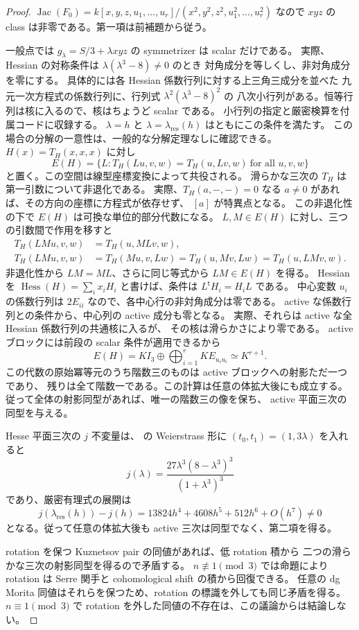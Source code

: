 \begin{proof}
$\operatorname{Jac}(F_0)=k[x,y,z,u_1,\ldots,u_r]/(x^2,y^2,z^2,u_1^2,\ldots,u_r^2)$
なので $xyz$ の class は非零である。第一項は前補題から従う。

一般点では $g_\lambda=S/3+\lambda xyz$ の symmetrizer は scalar だけである。
実際、Hessian の対称条件は $\lambda(\lambda^3-8)\ne0$ のとき
対角成分を等しくし、非対角成分を零にする。
具体的には各 Hessian 係数行列に対する上三角三成分を並べた
九元一次方程式の係数行列に、行列式 $\lambda^2(\lambda^3-8)^2$ の
八次小行列がある。恒等行列は核に入るので、核はちょうど scalar である。
小行列の指定と厳密検算を付属コードに収録する。
$\lambda=h$ と $\lambda=\lambda_{\mathrm{res}}(h)$ はともにこの条件を満たす。
この場合の分解の一意性は、一般的な分解定理なしに確認できる。
$H(x)=T_H(x,x,x)$ に対し
\[
 E(H)=\{L:T_H(Lu,v,w)=T_H(u,Lv,w)\ \text{for all }u,v,w\}
\]
と置く。この空間は線型座標変換によって共役される。
滑らかな三次の $T_H$ は第一引数について非退化である。
実際、$T_H(a,-,-)=0$ なる $a\ne0$ があれば、その方向の座標に方程式が依存せず、
$[a]$ が特異点となる。
この非退化性の下で $E(H)$ は可換な単位的部分代数になる。
$L,M\in E(H)$ に対し、三つの引数間で作用を移すと
\[
 \begin{aligned}
 T_H(LMu,v,w)&=T_H(u,MLv,w),\\
 T_H(LMu,v,w)&=T_H(Mu,v,Lw)
             =T_H(u,Mv,Lw)=T_H(u,LMv,w).
 \end{aligned}
\]
非退化性から $LM=ML$、さらに同じ等式から $LM\in E(H)$ を得る。
Hessian を $\operatorname{Hess}(H)=\sum_i x_iH_i$ と書けば、条件は
$L^{\mathsf t}H_i=H_iL$ である。
中心変数 $u_i$ の係数行列は $2E_{ii}$ なので、各中心行の非対角成分は零である。
active な係数行列との条件から、中心列の active 成分も零となる。
実際、それらは active な全 Hessian 係数行列の共通核に入るが、
その核は滑らかさにより零である。
active ブロックには前段の scalar 条件が適用できるから
\[
 E(H)=K I_3\oplus\bigoplus_{i=1}^r K E_{u_i u_i}
 \simeq K^{r+1}.
\]
この代数の原始冪等元のうち階数三のものは active ブロックへの射影ただ一つであり、
残りは全て階数一である。この計算は任意の体拡大後にも成立する。
従って全体の射影同型があれば、唯一の階数三の像を保ち、
active 平面三次の同型を与える。

Hesse 平面三次の $j$ 不変量は、
\cite[Section~2, equations~(4)--(5)]{NFMArtebaniDolgachev} の
Weierstrass 形に $(t_0,t_1)=(1,3\lambda)$ を入れると
\[
 j(\lambda)=\frac{27\lambda^3(8-\lambda^3)^3}{(1+\lambda^3)^3}
\]
であり、厳密有理式の展開は
\[
 j(\lambda_{\mathrm{res}}(h))-j(h)
 =13824h^4+4608h^5+512h^6+O(h^7)\ne0
\]
となる。従って任意の体拡大後も active 三次は同型でなく、第二項を得る。

rotation を保つ Kuznetsov pair の同値があれば、低 rotation 積から
二つの滑らかな三次の射影同型を得るので矛盾する。
$n\not\equiv1\pmod3$ では命題により rotation は
Serre 関手と cohomological shift の積から回復できる。
任意の dg Morita 同値はそれらを保つため、rotation の標識を外しても同じ矛盾を得る。
$n\equiv1\pmod3$ で rotation を外した同値の不存在は、この議論からは結論しない。
\end{proof}

